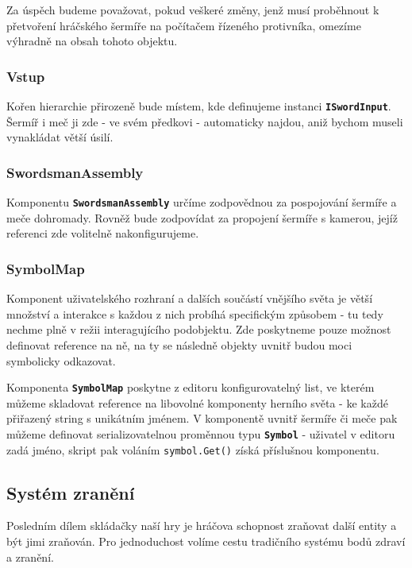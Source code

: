 Za úspěch budeme považovat, pokud veškeré změny, jenž musí proběhnout k přetvoření hráčského šermíře na počítačem řízeného protivníka, omezíme výhradně na obsah tohoto objektu.

\subsubsection*{Vstup}

Kořen hierarchie přirozeně bude místem, kde definujeme instanci \textbf{\texttt{ISwordInput}}. Šermíř i meč ji zde - ve svém předkovi - automaticky najdou, aniž bychom museli vynakládat větší úsilí.

\subsubsection*{SwordsmanAssembly}

Komponentu \textbf{\texttt{SwordsmanAssembly}} určíme zodpovědnou za pospojování šermíře a meče dohromady. Rovněž bude zodpovídat za propojení šermíře s kamerou, jejíž referenci zde volitelně nakonfigurujeme. 

\subsubsection*{SymbolMap}

Komponent uživatelského rozhraní a dalších součástí vnějšího světa je větší množství a interakce s každou z nich probíhá specifickým způsobem - tu tedy nechme plně v režii interagujícího podobjektu. Zde poskytneme pouze možnost definovat reference na ně, na ty se následně objekty uvnitř budou moci symbolicky odkazovat.

Komponenta \textbf{\texttt{SymbolMap}} poskytne z editoru konfigurovatelný list, ve kterém můžeme skladovat reference na libovolné komponenty herního světa - ke každé přiřazený string s unikátním jménem. V komponentě uvnitř šermíře či meče pak můžeme definovat serializovatelnou proměnnou typu \textbf{\texttt{Symbol}} - uživatel v editoru zadá jméno, skript pak voláním \texttt{symbol.Get()} získá příslušnou komponentu.


\subsection{Systém zranění}

Posledním dílem skládačky naší hry je hráčova schopnost zraňovat další entity a být jimi zraňován. Pro jednoduchost volíme cestu tradičního systému bodů zdraví a zranění.

